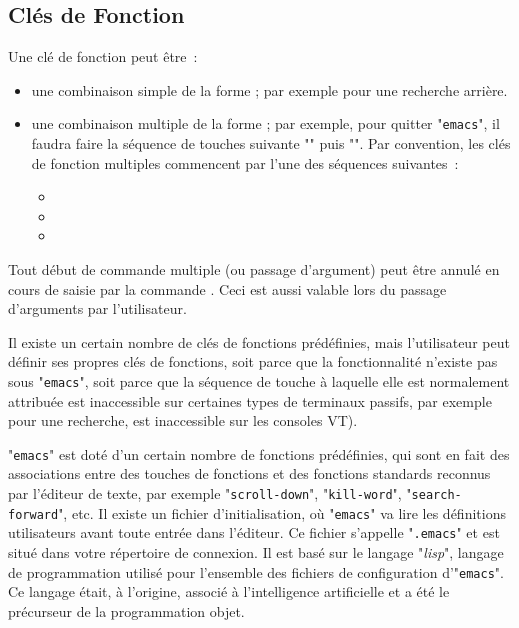 \subsection{Cl{\'e}s de Fonction}

Une cl{\'e} de fonction peut {\^e}tre~:
\begin{itemize}
	\item	une combinaison simple de la forme ;
			par exemple  pour une recherche arri{\`e}re.

	\item	une combinaison multiple de la forme  ;
			par exemple, pour quitter "{\tt emacs}", il faudra faire la s{\'e}quence
			de touches suivante "" puis "". Par convention,
			les cl{\'e}s de fonction multiples commencent par l'une des
			s{\'e}quences suivantes~:
			\begin{itemize}
				\item	{}
				\item	{}
				\item	{}
			\end{itemize}
\end{itemize}

Tout d{\'e}but de commande multiple (ou passage d'argument) peut {\^e}tre annul{\'e} en cours
de saisie par la commande . Ceci est aussi valable lors du passage
d'arguments par l'utilisateur.

\begin{remarque}
\label{emacs-control-s}
Il existe un certain nombre de cl{\'e}s de fonctions pr{\'e}d{\'e}finies,
mais l'utilisateur peut d{\'e}finir ses propres cl{\'e}s
de fonctions, soit parce que la fonctionnalit{\'e} n'existe
pas sous "{\tt emacs}", soit parce que la s{\'e}quence de touche {\`a}
laquelle elle est normalement attribu{\'e}e est inaccessible
sur certaines types de terminaux passifs, par exemple  pour
une recherche, est inaccessible sur les consoles VT).
\end{remarque}

"{\tt emacs}" est dot{\'e} d'un certain nombre de fonctions pr{\'e}d{\'e}finies,
qui sont en fait des associations entre des touches de fonctions
et des fonctions standards reconnus par l'{\'e}diteur de texte, par
exemple "{\tt scroll-down}", "{\tt kill-word}", "{\tt search-forward}", etc.
Il existe un fichier d'initialisation, o{\`u} "{\tt emacs}" va
lire les d{\'e}finitions utilisateurs avant toute entr{\'e}e
dans l'{\'e}diteur. Ce fichier s'appelle "{\tt .emacs}" et est
situ{\'e} dans votre r{\'e}pertoire de connexion. Il est bas{\'e} sur le langage "{\it lisp}",
langage de programmation utilis{\'e} pour l'ensemble des fichiers de configuration d'"{\tt emacs}".
Ce langage {\'e}tait, {\`a} l'origine, associ{\'e} {\`a} l'intelligence artificielle et a {\'e}t{\'e} le pr{\'e}curseur
de la programmation objet.


